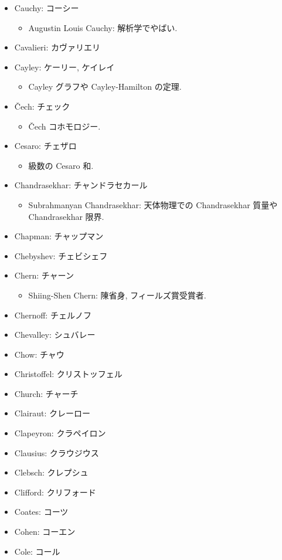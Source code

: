 \documentclass[openany, a4paper, oneside]{jsbook}
\begin{document}
\begin{itemize}
\item Cauchy: コーシー
\begin{itemize}
\item Augustin Louis Cauchy: 解析学でやばい.
\end{itemize}
\item Cavalieri: カヴァリエリ
\item Cayley: ケーリー, ケイレイ
\begin{itemize}
\item Cayley グラフや Cayley-Hamilton の定理.
\end{itemize}
\item \v{C}ech: チェック
\begin{itemize}
\item \v{C}ech コホモロジー.
\end{itemize}
\item Cesaro: チェザロ
\begin{itemize}
\item 級数の Cesaro 和.
\end{itemize}
\item Chandrasekhar: チャンドラセカール
\begin{itemize}
\item Subrahmanyan Chandrasekhar: 天体物理での Chandrasekhar 質量や Chandrasekhar 限界.
\end{itemize}
\item Chapman: チャップマン
\item Chebyshev: チェビシェフ
\item Chern: チャーン
\begin{itemize}
\item Shiing-Shen Chern: 陳省身, フィールズ賞受賞者.
\end{itemize}
\item Chernoff: チェルノフ
\item Chevalley: シュバレー
\item Chow: チャウ
\item Christoffel: クリストッフェル
\item Church: チャーチ
\item Clairaut: クレーロー
\item Clapeyron: クラペイロン
\item Clausius: クラウジウス
\item Clebsch: クレプシュ
\item Clifford: クリフォード
\item Coates: コーツ
\item Cohen: コーエン
\item Cole: コール

\end{itemize}
\end{document}
